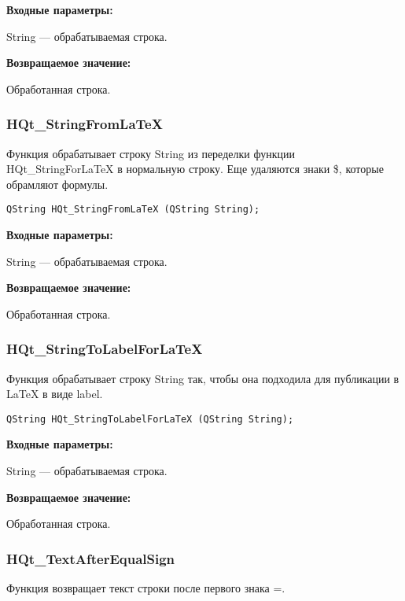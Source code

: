 \documentclass[a4paper,12pt]{article}
\begin{document}
\textbf{Входные параметры:}

String --- обрабатываемая строка.

\textbf{Возвращаемое значение:}
 
Обработанная строка.


\subsubsection{HQt\_StringFromLaTeX}\label{HQt_StringFromLaTeX}

Функция обрабатывает строку String из переделки функции HQt\_StringForLaTeX в нормальную строку. Еще удаляются знаки \$, которые обрамляют формулы.


\begin{lstlisting}[label=code_syntax_HQt_StringFromLaTeX,caption=Синтаксис]
QString HQt_StringFromLaTeX (QString String);
\end{lstlisting}

\textbf{Входные параметры:}

String --- обрабатываемая строка.

\textbf{Возвращаемое значение:}
 
Обработанная строка.


\subsubsection{HQt\_StringToLabelForLaTeX}\label{HQt_StringToLabelForLaTeX}

Функция обрабатывает строку String так, чтобы она подходила для публикации в LaTeX в виде label.


\begin{lstlisting}[label=code_syntax_HQt_StringToLabelForLaTeX,caption=Синтаксис]
QString HQt_StringToLabelForLaTeX (QString String);
\end{lstlisting}

\textbf{Входные параметры:}

String --- обрабатываемая строка.

\textbf{Возвращаемое значение:}
 
Обработанная строка.


\subsubsection{HQt\_TextAfterEqualSign}\label{HQt_TextAfterEqualSign}

Функция возвращает текст строки после первого знака =.
\end{document}
